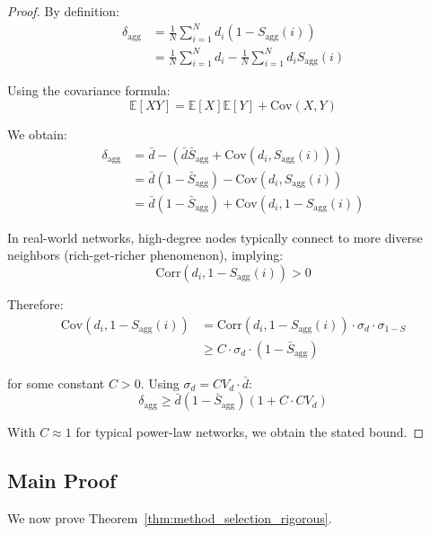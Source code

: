 \begin{proof}
By definition:
\begin{align}
\delta_{\text{agg}} &= \frac{1}{N}\sum_{i=1}^N d_i(1 - S_{\text{agg}}(i)) \\
&= \frac{1}{N}\sum_{i=1}^N d_i - \frac{1}{N}\sum_{i=1}^N d_i S_{\text{agg}}(i)
\end{align}

Using the covariance formula:
\begin{equation}
\mathbb{E}[XY] = \mathbb{E}[X]\mathbb{E}[Y] + \text{Cov}(X, Y)
\end{equation}

We obtain:
\begin{align}
\delta_{\text{agg}} &= \bar{d} - (\bar{d}\bar{S}_{\text{agg}} + \text{Cov}(d_i, S_{\text{agg}}(i))) \\
&= \bar{d}(1 - \bar{S}_{\text{agg}}) - \text{Cov}(d_i, S_{\text{agg}}(i)) \\
&= \bar{d}(1 - \bar{S}_{\text{agg}}) + \text{Cov}(d_i, 1 - S_{\text{agg}}(i))
\end{align}

In real-world networks, high-degree nodes typically connect to more diverse neighbors (rich-get-richer phenomenon), implying:
\begin{equation}
\text{Corr}(d_i, 1 - S_{\text{agg}}(i)) > 0
\end{equation}

Therefore:
\begin{align}
\text{Cov}(d_i, 1 - S_{\text{agg}}(i)) &= \text{Corr}(d_i, 1-S_{\text{agg}}(i)) \cdot \sigma_d \cdot \sigma_{1-S} \\
&\geq C \cdot \sigma_d \cdot (1 - \bar{S}_{\text{agg}})
\end{align}

for some constant $C > 0$. Using $\sigma_d = CV_d \cdot \bar{d}$:
\begin{equation}
\delta_{\text{agg}} \geq \bar{d}(1 - \bar{S}_{\text{agg}})(1 + C \cdot CV_d)
\end{equation}

With $C \approx 1$ for typical power-law networks, we obtain the stated bound.
\end{proof}

\subsection{Main Proof}

We now prove Theorem~\ref{thm:method_selection_rigorous}.

